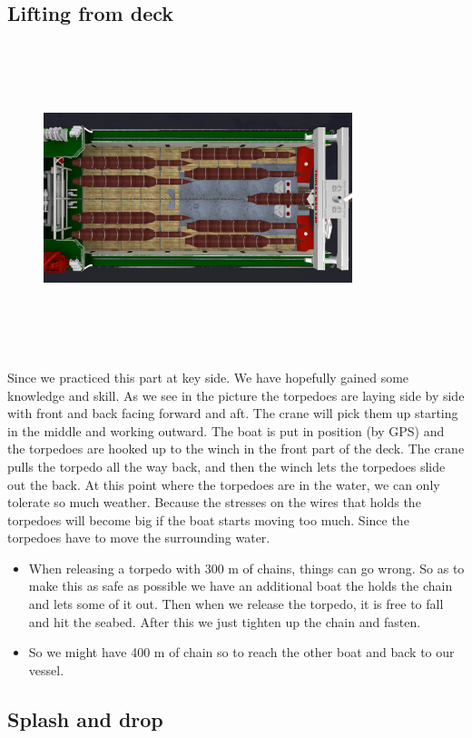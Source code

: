\documentclass[DIV=calc, paper=a4, fontsize=13pt, twocolumn]{scrartcl}	 %
\begin{document}
\subsection*{Lifting from deck}
\begin{figure}[h]
\includegraphics[width=9cm,height=9cm]{Triplex_MDH_140.jpg}
\end{figure}
Since we practiced this part at key side. We have hopefully gained some knowledge and skill. As we see in the picture the torpedoes are laying side by side with front and back facing forward and aft. The crane will pick them up starting in the middle and working outward. The boat is put in position (by GPS) and the torpedoes are hooked up to the winch in the front part of the deck. The crane pulls the torpedo all the way back, and then the winch lets the torpedoes slide out the back. At this point where the torpedoes are in the water, we can only tolerate so much weather. Because the stresses on the wires that holds the torpedoes will become big if the boat starts moving too much. Since the torpedoes have to move the surrounding water. 
\begin{itemize}
\item When releasing a torpedo with 300 m of chains, things can go wrong. So as to make this as safe as possible we have an additional boat the holds the chain and lets some of it out. Then when we release the torpedo, it is free to fall and hit the seabed. After this we just tighten up the chain and fasten. 
\item So we might have 400 m of chain so to reach the other boat and back to our vessel.
\end{itemize}
\subsection*{Splash and drop}
\end{document}
